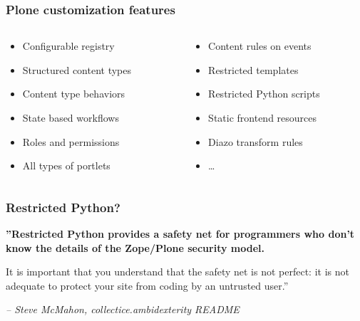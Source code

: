 \documentclass[aspectratio=43]{beamer}
\begin{document}
\begin{frame}[plain,t]
  \frametitle{Plone customization features}
  \begin{columns}[onlytextwidth,t]
  \begin{column}{0.45\textwidth}
  \begin{itemize}
  \setlength{\itemsep}{1em}
  \mdseries
  \item Configurable registry
  \item Structured content types
  \item Content type behaviors
  \item State based workflows
  \item Roles and permissions
  \item All types of portlets
  \end{itemize}
  \end{column}
  \begin{column}{0.45\textwidth}
  \begin{itemize}
  \setlength{\itemsep}{1em}
  \mdseries
  \item Content rules on events
  \bfseries
  \item Restricted templates
  \item Restricted Python scripts
  \mdseries
  \item Static frontend resources
  \item Diazo transform rules
  \item \ldots
  \end{itemize}
  \end{column}
  \end{columns}
\end{frame}

\begin{frame}[plain,c]
  \frametitle{Restricted Python?}
  \Large
  \bfseries
  ”Restricted Python provides a safety net for programmers who don't know the details of the Zope/Plone security model.
  \par
  \vspace{1em}
  It is important that you understand that the safety net is not perfect: it is not adequate to protect your site from coding by an untrusted user.”
  \par
  \vspace{1em}
  \normalsize
  \raggedleft
  \mdseries
  \textit{-- Steve McMahon, collectice.ambidexterity README}
\end{frame}
\end{document}
